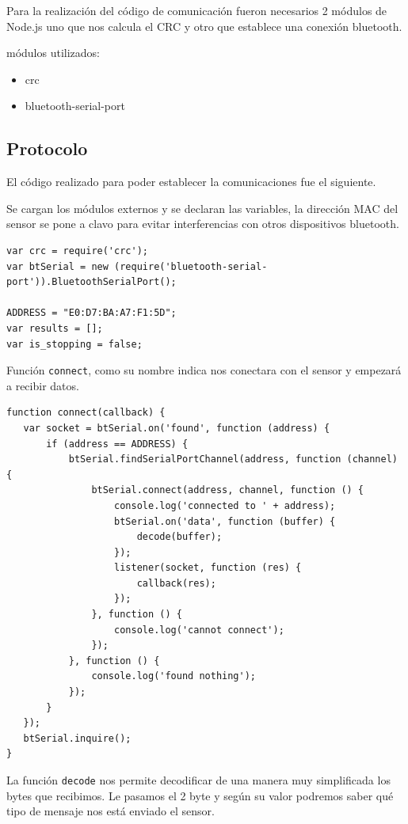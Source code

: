 Para la realización del código de comunicación fueron necesarios 2 módulos de Node.js uno que nos calcula el CRC y otro que establece una conexión bluetooth.

módulos utilizados:

\begin{itemize}
\item crc
\item bluetooth-serial-port 
\end{itemize}
\pagebreak

\subsection{Protocolo}

El código realizado para poder establecer la comunicaciones fue el siguiente.
 
Se cargan los módulos externos y se declaran las variables, la dirección MAC del sensor se pone a clavo para evitar interferencias con otros dispositivos bluetooth.

\begin{verbatim}
var crc = require('crc');
var btSerial = new (require('bluetooth-serial-port')).BluetoothSerialPort();

ADDRESS = "E0:D7:BA:A7:F1:5D";
var results = [];
var is_stopping = false;
\end{verbatim}

Función \texttt{connect}, como su nombre indica nos conectara con el sensor y empezará a recibir datos. 

\begin{verbatim}
function connect(callback) {
   var socket = btSerial.on('found', function (address) {
       if (address == ADDRESS) {
           btSerial.findSerialPortChannel(address, function (channel) {
               btSerial.connect(address, channel, function () {
                   console.log('connected to ' + address);
                   btSerial.on('data', function (buffer) {
                       decode(buffer);
                   });
                   listener(socket, function (res) {
                       callback(res);
                   });
               }, function () {
                   console.log('cannot connect');
               });
           }, function () {
               console.log('found nothing');
           });
       }
   });
   btSerial.inquire();
}
\end{verbatim}

La función \texttt{decode} nos permite decodificar de una manera muy simplificada los bytes que recibimos. Le pasamos el 2 byte y según su valor podremos saber qué tipo de mensaje nos está enviado el sensor. 

